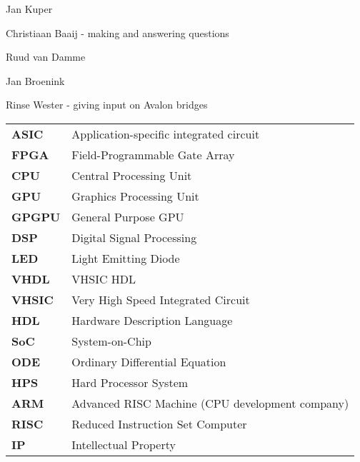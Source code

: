 
\begin{acknowledgements}      
\begin{itemizens}
	\item Jan Kuper	
	\item Christiaan Baaij - making \clash{} and answering questions
	\item Ruud van Damme
	\item Jan Broenink
	\item Rinse Wester - giving input on Avalon bridges
\end{itemizens}

\end{acknowledgements}


\vfill

\begin{acronyms}
\begin{tabular}{>{\bfseries}l l}
	ASIC & Application-specific integrated circuit \\
	FPGA & Field-Programmable Gate Array \\
	CPU & Central Processing Unit \\
	GPU & Graphics Processing Unit \\
	GPGPU & General Purpose GPU \\
	DSP & Digital Signal Processing \\
	LED & Light Emitting Diode \\
	VHDL & VHSIC HDL \\
	VHSIC & Very High Speed Integrated Circuit \\
	HDL & Hardware Description Language \\
	SoC & System-on-Chip \\ 
	ODE & Ordinary Differential Equation \\
	HPS & Hard Processor System \\
	ARM & Advanced RISC Machine (CPU development company) \\
	RISC & Reduced Instruction Set Computer \\
	IP & Intellectual Property \\
	
\end{tabular}		
\end{acronyms}    

  
